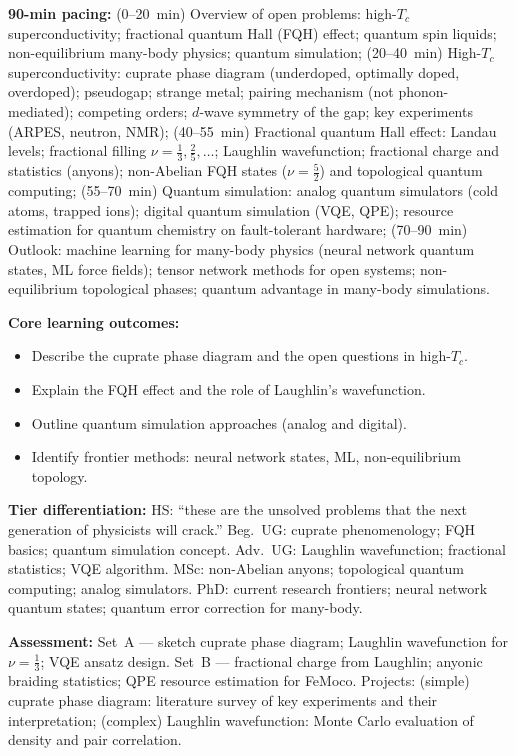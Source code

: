 \documentclass[11pt,a4paper]{article}
\begin{document}
\medskip

\begin{tcolorbox}[modulebox, title={Module~II.7 --- Lecture L12: Open Problems and Frontiers}]
\textbf{90-min pacing:} (0--20~min) Overview of open problems: high-$T_c$ superconductivity; fractional quantum Hall (FQH) effect; quantum spin liquids; non-equilibrium many-body physics; quantum simulation; (20--40~min) High-$T_c$ superconductivity: cuprate phase diagram (underdoped, optimally doped, overdoped); pseudogap; strange metal; pairing mechanism (not phonon-mediated); competing orders; $d$-wave symmetry of the gap; key experiments (ARPES, neutron, NMR); (40--55~min) Fractional quantum Hall effect: Landau levels; fractional filling $\nu=\tfrac{1}{3},\tfrac{2}{5},\ldots$; Laughlin wavefunction; fractional charge and statistics (anyons); non-Abelian FQH states ($\nu=\tfrac{5}{2}$) and topological quantum computing; (55--70~min) Quantum simulation: analog quantum simulators (cold atoms, trapped ions); digital quantum simulation (VQE, QPE); resource estimation for quantum chemistry on fault-tolerant hardware; (70--90~min) Outlook: machine learning for many-body physics (neural network quantum states, ML force fields); tensor network methods for open systems; non-equilibrium topological phases; quantum advantage in many-body simulations.

\medskip\textbf{Core learning outcomes:}
\begin{itemize}[leftmargin=1.4em,topsep=2pt,itemsep=1pt]
  \item Describe the cuprate phase diagram and the open questions in high-$T_c$.
  \item Explain the FQH effect and the role of Laughlin's wavefunction.
  \item Outline quantum simulation approaches (analog and digital).
  \item Identify frontier methods: neural network states, ML, non-equilibrium topology.
\end{itemize}

\medskip\textbf{Tier differentiation:}
HS: ``these are the unsolved problems that the next generation of physicists will crack.''
Beg.\ UG: cuprate phenomenology; FQH basics; quantum simulation concept.
Adv.\ UG: Laughlin wavefunction; fractional statistics; VQE algorithm.
MSc: non-Abelian anyons; topological quantum computing; analog simulators.
PhD: current research frontiers; neural network quantum states; quantum error correction for many-body.

\medskip\textbf{Assessment:}
Set~A --- sketch cuprate phase diagram; Laughlin wavefunction for $\nu=\tfrac{1}{3}$; VQE ansatz design.
Set~B --- fractional charge from Laughlin; anyonic braiding statistics; QPE resource estimation for FeMoco.
Projects: (simple) cuprate phase diagram: literature survey of key experiments and their interpretation;
(complex) Laughlin wavefunction: Monte Carlo evaluation of density and pair correlation.
\end{tcolorbox}
\end{document}
